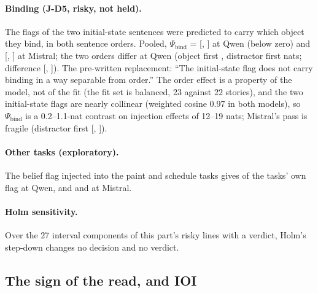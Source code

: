 \paragraph{Binding (J-D5, risky, not held).} The flags of the two initial-state sentences were predicted to carry which object they bind, in both sentence orders. Pooled, $\Psi_{\mathrm{bind}}$ = \JdFivePooledQwenSeven{} [\JdFivePooledQwenSevenLo{}, \JdFivePooledQwenSevenHi{}] at Qwen (below zero) and \JdFivePooledMistralSeven{} [\JdFivePooledMistralSevenLo{}, \JdFivePooledMistralSevenHi{}] at Mistral; the two orders differ at Qwen (object first \JdFiveObjQwenSeven{}, distractor first \JdFiveDisQwenSeven{} nats; difference \JdFiveDiffQwenSeven{} [\JdFiveDiffQwenSevenLo{}, \JdFiveDiffQwenSevenHi{}]). The pre-written replacement: ``The initial-state flag does not carry binding in a way separable from order.'' The order effect is a property of the model, not of the fit (the fit set is balanced, 23 against 22 stories), and the two initial-state flags are nearly collinear (weighted cosine 0.97 in both models), so $\Psi_{\mathrm{bind}}$ is a 0.2--1.1-nat contrast on injection effects of 12--19 nats; Mistral's pass is fragile (distractor first \JdFiveDisMistralSeven{} [\JdFiveDisMistralSevenLo{}, \JdFiveDisMistralSevenHi{}]). %

\paragraph{Other tasks (exploratory).} The belief flag injected into the paint and schedule tasks gives \JdXtaskPaintQwenSeven{} of the tasks' own flag at Qwen, and \JdXtaskPaintMistralSeven{} and \JdXtaskScheduleMistralSeven{} at Mistral.

\paragraph{Holm sensitivity.} Over the 27 interval components of this part's risky lines with a verdict, Holm's step-down changes no decision and no verdict. %

\subsection{The sign of the read, and IOI}\label{app:sign}

